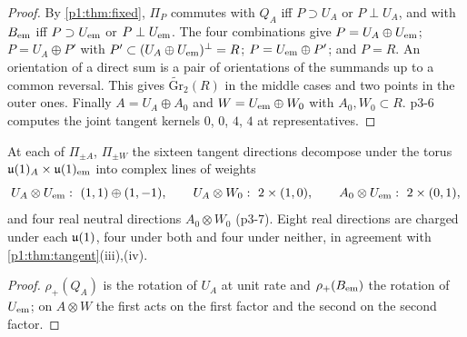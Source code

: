 \begin{proof}
By \cref{p1:thm:fixed}, $\Pi_P$ commutes with $Q_A$ iff $P\supset U_A$ or $P\perp U_A$, and with $B_{\rm em}$ iff $P\supset U_{\rm em}$ or $P\perp U_{\rm em}$. The four
combinations give $P=U_A\oplus U_{\rm em}$; $P=U_A\oplus P'$ with $P'\subset(U_A\oplus U_{\rm em})^\perp=R$; $P=U_{\rm em}\oplus P'$; and $P=R$. An orientation of a direct sum
is a pair of orientations of the summands up to a common reversal. This gives $\widetilde{\mathrm{Gr}}_2(R)$ in the middle cases and two points in the outer ones. Finally
$A=U_A\oplus A_0$ and $W=U_{\rm em}\oplus W_0$ with $A_0,W_0\subset R$. p3-6 computes the joint tangent kernels $0$, $0$, $4$, $4$ at representatives.
\end{proof}

\begin{proposition}
\label{p3:prop:torus}
At each of $\Pi_{\pm A}$, $\Pi_{\pm W}$ the sixteen tangent directions decompose under the torus $\mathfrak{u}(1)_A\times\mathfrak{u}(1)_{\rm em}$ into complex lines of weights
\[
U_A\otimes U_{\rm em}:\ (1,1)\oplus(1,-1),\qquad U_A\otimes W_0:\ 2\times(1,0),\qquad A_0\otimes U_{\rm em}:\ 2\times(0,1),
\]
and four real neutral directions $A_0\otimes W_0$ (p3-7). Eight real directions are charged under each $\mathfrak{u}(1)$, four under both and four under neither, in agreement
with \cref{p1:thm:tangent}(iii),(iv).
\end{proposition}

\begin{proof}
$\rho_+(Q_A)$ is the rotation of $U_A$ at unit rate and $\rho_+(B_{\rm em})$ the rotation of $U_{\rm em}$; on $A\otimes W$ the first acts on the first factor and the
second on the second factor.
\end{proof}

